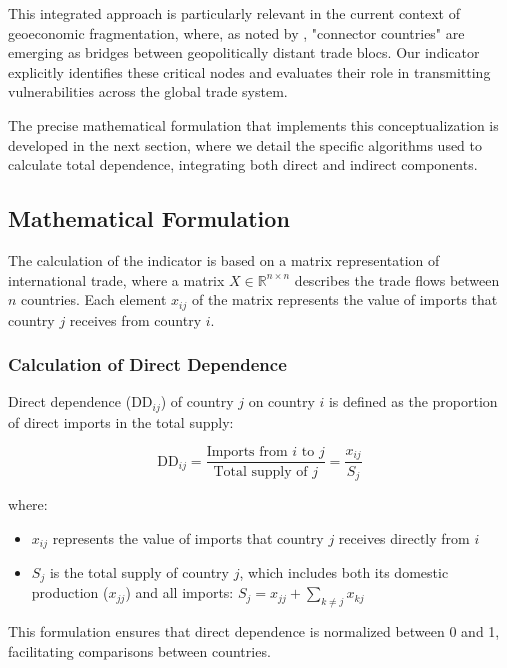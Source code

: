 \documentclass[final,1p,times,authoryear]{elsarticle}
\begin{document}
This integrated approach is particularly relevant in the current context of geoeconomic fragmentation, where, as noted by \citet{Gopinath2024}, "connector countries" are emerging as bridges between geopolitically distant trade blocs. Our indicator explicitly identifies these critical nodes and evaluates their role in transmitting vulnerabilities across the global trade system.

The precise mathematical formulation that implements this conceptualization is developed in the next section, where we detail the specific algorithms used to calculate total dependence, integrating both direct and indirect components.

\subsection{Mathematical Formulation}

The calculation of the indicator is based on a matrix representation of international trade, where a matrix $X \in \mathbb{R}^{n \times n}$ describes the trade flows between $n$ countries. Each element $x_{ij}$ of the matrix represents the value of imports that country $j$ receives from country $i$.

\subsubsection{Calculation of Direct Dependence}

Direct dependence ($\text{DD}_{ij}$) of country $j$ on country $i$ is defined as the proportion of direct imports in the total supply:

\begin{equation}
\text{DD}_{ij} = \frac{\text{Imports from $i$ to $j$}}{\text{Total supply of $j$}} = \frac{x_{ij}}{S_j}
\end{equation}

where:
\begin{itemize}
    \item $x_{ij}$ represents the value of imports that country $j$ receives directly from $i$
    \item $S_j$ is the total supply of country $j$, which includes both its domestic production ($x_{jj}$) and all imports: $S_j = x_{jj} + \sum_{k\neq j} x_{kj}$
\end{itemize}

This formulation ensures that direct dependence is normalized between 0 and 1, facilitating comparisons between countries.
\end{document}

